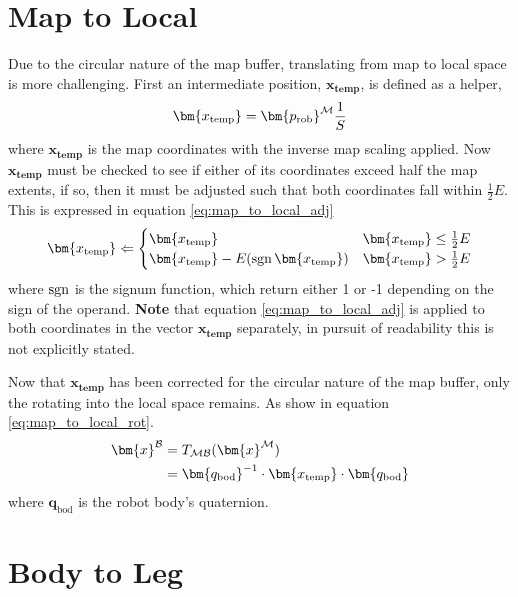     \section{Map to Local}
        Due to the circular nature of the map buffer, translating from map to local space is more challenging. First an intermediate position, \(\bm{x_\text{temp}}\), is defined as a helper,
        \begin{equation} \label{eq:map_to_local_help}
            \bm{x_\text{temp}} = \bm{p_\text{rob}}\inrefframe{\fmap}\frac{1}{S}
        \end{equation}
        where \(\bm{x_\text{temp}}\) is the map coordinates with the inverse map scaling applied. Now \(\bm{x_\text{temp}}\) must be checked to see if either of its 
        coordinates exceed half the map extents, if so, then it must be adjusted such that both coordinates fall within \(\frac{1}{2}E\).
        This is expressed in equation \ref{eq:map_to_local_adj}
        \begin{equation} \label{eq:map_to_local_adj}
            \bm{x_\text{temp}} \Leftarrow 
            \begin{cases}
                \bm{x_\text{temp}} & \bm{x_\text{temp}} \leq \frac{1}{2}E \\
                \bm{x_\text{temp}} - E(\sgn \bm{x_\text{temp}}) & \bm{x_\text{temp}} > \frac{1}{2}E
            \end{cases}
        \end{equation}
        where \(\operatorname{sgn}\) is the signum function, which return either 1 or -1 depending on the sign of the operand. 
        \textbf{Note} that equation \ref{eq:map_to_local_adj} is applied to both coordinates in the vector \(\bm{x_\text{temp}}\) separately, in pursuit of readability this is not explicitly stated.

        Now that \(\bm{x_\text{temp}}\) has been corrected for the circular nature of the map buffer, only the rotating into the local space remains. As show in equation \ref{eq:map_to_local_rot}.
        \begin{align} \label{eq:map_to_local_rot}
        \begin{split}
            \bm{x}\inrefframe{\fbody} &= \transframe{\bm{x}\inrefframe{\fmap}}{\fmap}{\fbody} \\
            &= \bm{q_\text{bod}}^{-1} \cdot \bm{x_\text{temp}} \cdot \bm{q_\text{bod}}
        \end{split}
        \end{align}
        where \(\bm{q}_\text{bod}\) is the robot body's quaternion.
    
    \section{Body to Leg}